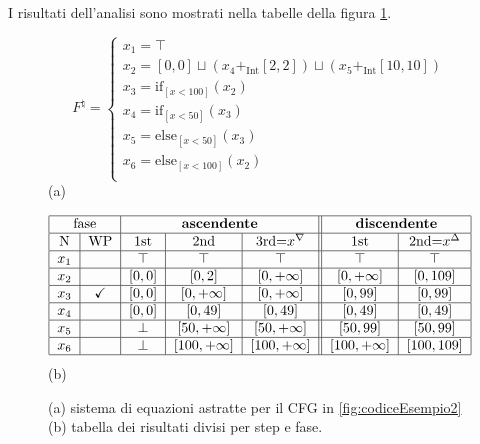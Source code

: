 \begin{example}
I risultati dell'analisi sono mostrati nella tabelle della figura \ref{fig:ris}.
\begin{figure}[H]
\begin{minipage}{\textwidth}
\vspace{1cm}
\[
F^{\natural}=
\begin{cases}
    x_1 = \top \\
    x_2 = [0, 0]\sqcup(x_4 +_{\textrm{Int}} [2, 2])\sqcup(x_5 +_{\textrm{Int}} [10, 10]) \\
    x_3 = \textrm{if}_{[x<100]}(x_2) \\
    x_4 = \textrm{if}_{[x<50]}(x_3) \\
    x_5 = \textrm{else}_{[x<50]}(x_3) \\
    x_6 = \textrm{else}_{[x<100]}(x_2) \\
\end{cases}
\]  
\centering
(a)
\end{minipage}
\begin{minipage}{\textwidth}
    \centering
    \vspace{1cm}
        \[
        \begin{tabular}{|c|c|c|c|c||c|c|c||}
        \hline
        \multicolumn{2}{|c|}{fase} & 
        \multicolumn{3}{c||}{\textbf{ascendente}} & 
        \multicolumn{2}{c|}{\textbf{discendente}}\\
        
        \hline 
        N & WP & 1st & 2nd & 3rd=$x^{\nabla}$ & 1st & 2nd=$x^{\Delta}$  \\
        \hline
        $x_1$ &  &  
            $\top$ & $\top$ & $\top$ & 
            $\top$ & $\top$ \\
        \hline
        $x_2$ &  & 
            $\left[0, 0\right]$ & $\left[0, 2\right]$ & $\left[0, +\infty \right]$ & 
            $\left[0, +\infty \right]$ & $\left[0, 109\right]$ \\
        \hline
        $x_3$ & \checkmark & 
            $\left[0, 0\right]$ & $\left[0, +\infty \right]$ & $\left[0, +\infty \right]$ & 
            $\left[0, 99\right]$ & $\left[0, 99\right]$ \\
        \hline
        $x_4$ &  & 
            $\left[0, 0\right]$ & $\left[0, 49\right]$ & $\left[0, 49\right]$ & 
            $\left[0, 49\right]$ & $\left[0, 49\right]$ \\
        \hline
        $x_5$ &  & 
            $\perp$ & $\left[50, +\infty \right]$ & $\left[50, +\infty \right]$ & 
            $\left[50, 99\right]$ & $\left[50, 99\right]$ \\
        \hline
        $x_6$ &  & 
            $\perp$ & $\left[100, +\infty \right]$ & $\left[100, +\infty \right]$ & 
            $\left[100, +\infty \right]$ & $\left[100, 109\right]$ \\
        \hline
        \end{tabular}
        \]
        (b)
    \end{minipage}
    \caption{(a) sistema di equazioni astratte per il CFG in \ref{fig:codiceEsempio2} (b) tabella dei risultati divisi per step e fase.}
    \label{fig:ris}
\end{figure}
\end{example}

